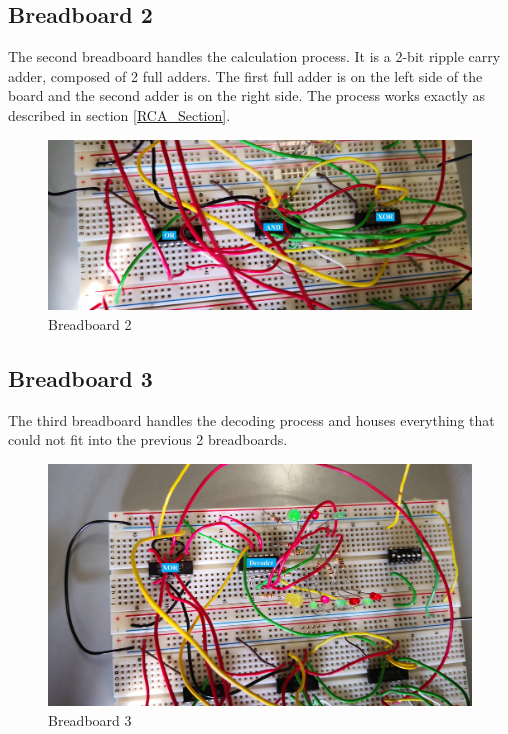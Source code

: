 \documentclass{article}
\begin{document}
\subsection{Breadboard 2}

The second breadboard handles the calculation process. It is a 2-bit ripple carry adder, composed of 2 full adders. The first full adder is on the left side of the board and the second adder is on the right side. The process works exactly as described in section \ref{RCA_Section}. 

\begin{figure}[h]
  \centering
  \includegraphics[width=\linewidth]{breadboard2}
  \caption{Breadboard 2}
  \label{breadboard2}
\end{figure}

\clearpage

\subsection{Breadboard 3}

The third breadboard handles the decoding process and houses everything that could not fit into the previous 2 breadboards. 

\begin{figure}[h]
  \centering
  \includegraphics[width=\linewidth]{breadboard3}
  \caption{Breadboard 3}
  \label{breadboard3}
\end{figure}
\end{document}
